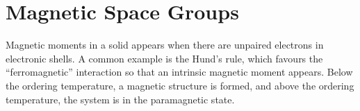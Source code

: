 %
%
%
%
%
%
%
%
%
%

\section{Magnetic Space Groups} \label{sec:magnetic_space_groups}

Magnetic moments in a solid appears when there are unpaired electrons in electronic shells. A common example is the Hund's rule, which favours the ``ferromagnetic'' interaction so that an intrinsic magnetic moment appears. Below the ordering temperature, a magnetic structure is formed, and above the ordering temperature, the system is in the paramagnetic state.

